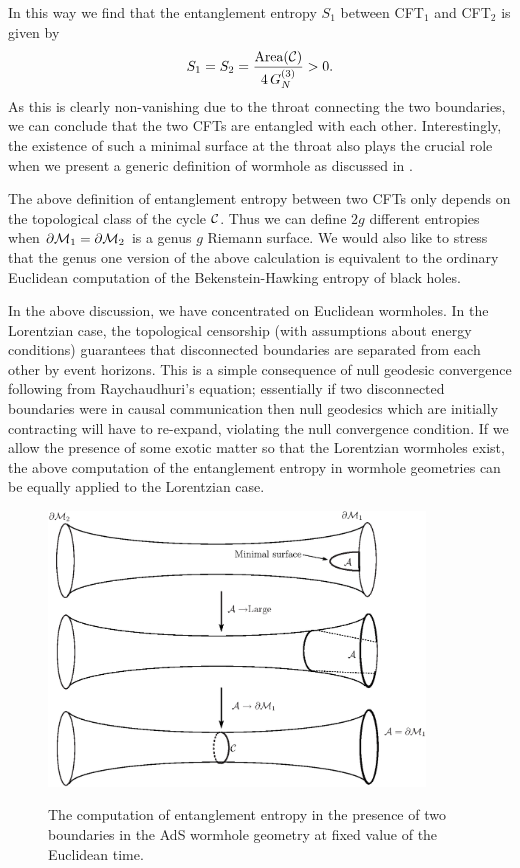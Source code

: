 \documentclass[12pt]{article}
\newcommand{\be}{\begin{equation}}
\newcommand{\ee}{\end{equation}}
\def\p{\partial}
\def\p{\partial}
\def\f#1#2{{\frac{#1}{#2}}}
\def\f#1#2{{\frac{#1}{#2}}}
\def\p{\partial}
\def\bdy{\p{\cal M}}
\def\f {\frac}
\begin{document}
In this way we find that the entanglement entropy $S_1$ between
CFT$_1$ and CFT$_2$ is given by
%
\be S_1=S_2=\f{\mbox{Area}({\cal
C})}{4\,G^{(3)}_{N}}>0. \ee
%
As this is clearly non-vanishing due to the throat connecting the two boundaries, we can conclude that the two CFTs are entangled with each other. Interestingly, the existence of such a minimal surface at the throat also plays the crucial role when we present a generic definition of wormhole as discussed in \cite{Hochberg:1997wp}.

The above definition of entanglement entropy between two CFTs only
depends on the topological class of the cycle ${\cal C}$. Thus we
can define $2g$ different entropies when $\bdy_1=\bdy_2$ is a genus
$g$ Riemann surface. We would also like to stress that the genus one version of the above calculation is equivalent to the ordinary Euclidean computation of the Bekenstein-Hawking entropy of black holes.

In the above discussion, we have concentrated on Euclidean wormholes. In
the Lorentzian case, the topological censorship \cite{Galloway:1999br}
(with assumptions about energy conditions) guarantees that disconnected
boundaries  are separated from each other by event horizons. This is a
simple consequence of null geodesic convergence following from Raychaudhuri's equation;
essentially if two disconnected boundaries were in causal communication then null geodesics
which are initially contracting will have to re-expand, violating the null convergence condition.
If we allow the presence of some exotic matter so that the Lorentzian wormholes exist,
the above computation of the entanglement entropy in wormhole geometries can be equally
applied to the Lorentzian case.

\begin{figure}
\begin{center}
  \includegraphics[width=10cm]{wormhole}\\
  \caption{The computation of entanglement entropy in the
presence of two boundaries in the AdS wormhole geometry at fixed
value of the Euclidean time.}\label{wormhole2}
\end{center}
\end{figure}
\end{document}
